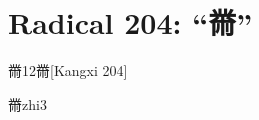 
\section*{Radical 204: ``⿋''}

\begin{entry}{黹}{12}{⿋}[Kangxi 204]
  \begin{phonetics}{黹}{zhi3}
  \end{phonetics}
\end{entry}


